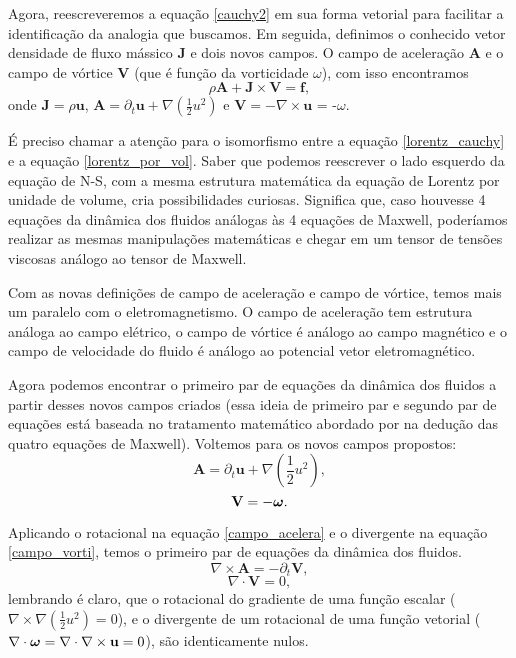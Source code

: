 Agora, reescreveremos a equação \ref{cauchy2} em sua forma vetorial para facilitar a identificação da analogia que buscamos. Em seguida, definimos o conhecido vetor densidade de fluxo mássico $\textbf{J}$ e dois novos campos. O campo de aceleração $\textbf{A}$ e o campo de vórtice $\textbf{V}$ (que é função da vorticidade {\boldmath$\omega$}), com isso encontramos
\begin{equation}\label{lorentz_cauchy}
    \rho \textbf{A} + \textbf{J} \times \textbf{V}= \textbf{f} ,
\end{equation}
onde $\textbf{J} = \rho \textbf{u}$, $\textbf{A} = \partial_{t}\textbf{u} + \nabla(\frac{1}{2}u^2)$ e $\textbf{V} = - \nabla\times\textbf{u}$ = -{\boldmath$\omega$}.

É preciso chamar a atenção para o isomorfismo entre a equação \ref{lorentz_cauchy} e a equação \ref{lorentz_por_vol}. Saber que podemos reescrever o lado esquerdo da equação de N-S, com a mesma estrutura matemática da equação de Lorentz por unidade de volume, cria possibilidades curiosas. Significa que, caso houvesse 4 equações da dinâmica dos fluidos análogas às 4 equações de Maxwell, poderíamos realizar as mesmas manipulações matemáticas e chegar em um tensor de tensões viscosas análogo ao tensor de Maxwell.

Com as novas definições de campo de aceleração e campo de vórtice, temos mais um paralelo com o eletromagnetismo. O campo de aceleração tem estrutura análoga ao campo elétrico, o campo de vórtice é análogo ao campo magnético e o campo de velocidade do fluido é análogo ao potencial vetor eletromagnético.

Agora podemos encontrar o primeiro par de equações da dinâmica dos fluidos a partir desses novos campos criados (essa ideia de primeiro par e segundo par de equações está baseada no tratamento matemático abordado por \cite{landau2013classical} na dedução das quatro equações de Maxwell). Voltemos para os novos campos propostos:
\begin{equation}\label{campo_acelera}
    \textbf{A} = \partial_{t}\textbf{u} + \nabla(\frac{1}{2}u^2),
\end{equation}
\begin{equation}\label{campo_vorti}
    \textbf{V} =-\text{\boldmath$\omega$}.
\end{equation}

Aplicando o rotacional na equação \ref{campo_acelera} e o divergente na equação \ref{campo_vorti}, temos o primeiro par de equações da dinâmica dos fluidos.
\begin{equation}\label{faradey_fluidos}
    \nabla \times \textbf{A} = -\partial_{t} \textbf{V},
\end{equation}
\begin{equation}\label{gauss_mag_fluid}
    \nabla \cdot \textbf{V}=0,
\end{equation}
lembrando é claro, que o rotacional do gradiente de uma função escalar ($\nabla\times\nabla(\frac{1}{2}u^2) = 0$), e o divergente de um rotacional de uma função vetorial ($\nabla\cdot\text{\boldmath$\omega$} = \nabla\cdot\nabla\times\textbf{u} = 0$), são identicamente nulos.

